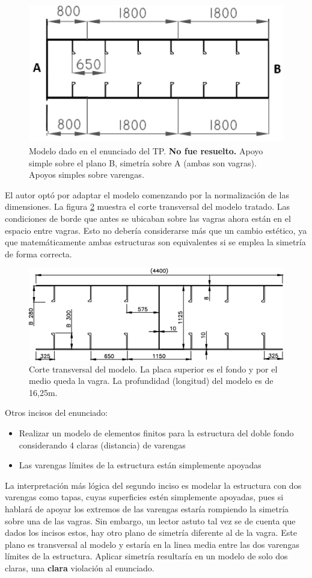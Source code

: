 \documentclass[onecolumn,10pt,titlepage]{article}
\newcommand{\unit}[1]{\textsf{#1}}
\newcommand{\meter}{\unit{m}}
\newcommand{\si}[1]{#1}
\newcommand{\SI}[2]{#1\si{#2}}
\begin{document}
\begin{figure}[htb!]
	\centering
	\includegraphics[width=.5\textwidth]{fig/modelocatedra.png}
	\caption{Modelo dado en el enunciado del TP. \textbf{No fue resuelto.} Apoyo simple sobre el plano B, simetría sobre A (ambas son vagras). Apoyos simples sobre varengas.}
	\label{fig:modelocatedra}
\end{figure}
El autor optó por adaptar el modelo comenzando por la normalización de las dimensiones. La figura \ref{fig:modeloTransversal} muestra el corte transversal del modelo tratado. Las condiciones de borde que antes se ubicaban sobre las vagras ahora están en el espacio entre vagras. Esto no debería considerarse más que un cambio estético, ya que matemáticamente ambas estructuras son equivalentes si se emplea la simetría de forma correcta.
\begin{figure}[htb!]
	\centering
	\includegraphics[width=0.7\linewidth]{fig/MODELO.eps}
	\caption{Corte transversal del modelo. La placa superior es el fondo y por el medio queda la vagra. La profundidad (longitud) del modelo es de \SI{16,25}{\meter}.}
	\label{fig:modeloTransversal}
\end{figure}

Otros incisos del enunciado:
\begin{itemize}
	\item Realizar un modelo de elementos finitos para la estructura del doble fondo considerando 4 claras (distancia) de varengas
	\item Las varengas límites de la estructura están simplemente apoyadas
\end{itemize}
La interpretación más lógica del segundo inciso es modelar la estructura con dos varengas como tapas, cuyas superficies estén simplemente apoyadas, pues si hablará de apoyar los extremos de las varengas estaría rompiendo la simetría sobre una de las vagras. Sin embargo, un lector astuto tal vez se de cuenta que dados los incisos estos, hay otro plano de simetría diferente al de la vagra. Este plano es transversal al modelo y estaría en la linea media entre las dos varengas límites de la estructura. Aplicar simetría resultaría en un modelo de solo dos claras, una \textbf{clara} violación al enunciado.
\end{document}
